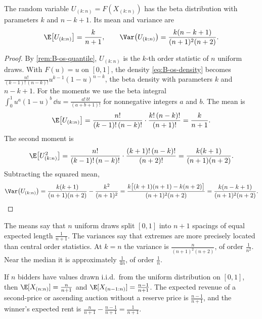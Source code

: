\begin{proposition}\label{prop:B-os-uniform}
The random variable $U_{(k:n)} = F(X_{(k:n)})$ has the beta distribution with parameters $k$ and $n-k+1$.
Its mean and variance are
\begin{equation}\label{eq:B-os-beta-moments}
  \E\big[U_{(k:n)}\big] = \frac{k}{n+1}, \qquad \Var\big(U_{(k:n)}\big) = \frac{k(n-k+1)}{(n+1)^2(n+2)}.
\end{equation}
\end{proposition}

\begin{proof}
By \cref{rem:B-os-quantile}, $U_{(k:n)}$ is the $k$-th order statistic of $n$ uniform draws. With $F(u) = u$
on $[0,1]$, the density \eqref{eq:B-os-density} becomes $\frac{n!}{(k-1)!\,(n-k)!}u^{k-1}(1-u)^{n-k}$, the
beta density with parameters $k$ and $n-k+1$. For the moments we use the beta integral
$\int_0^1 u^a(1-u)^b\,\dd u = \frac{a!\,b!}{(a+b+1)!}$ for nonnegative integers $a$ and $b$. The mean is
\begin{equation*}
  \E\big[U_{(k:n)}\big] = \frac{n!}{(k-1)!\,(n-k)!}\cdot\frac{k!\,(n-k)!}{(n+1)!} = \frac{k}{n+1}.
\end{equation*}
The second moment is
\begin{equation*}
  \E\big[U_{(k:n)}^2\big] = \frac{n!}{(k-1)!\,(n-k)!}\cdot\frac{(k+1)!\,(n-k)!}{(n+2)!}
  = \frac{k(k+1)}{(n+1)(n+2)}.
\end{equation*}
Subtracting the squared mean,
\begin{equation*}
  \Var\big(U_{(k:n)}\big) = \frac{k(k+1)}{(n+1)(n+2)} - \frac{k^2}{(n+1)^2}
  = \frac{k\big[(k+1)(n+1) - k(n+2)\big]}{(n+1)^2(n+2)} = \frac{k(n-k+1)}{(n+1)^2(n+2)}.
\end{equation*}
\end{proof}

The means say that $n$ uniform draws split $[0,1]$ into $n+1$ spacings of equal expected length
$\frac{1}{n+1}$. The variances say that extremes are more precisely located than central order
statistics. At $k = n$ the variance is $\frac{n}{(n+1)^2(n+2)}$, of order $\frac{1}{n^2}$. Near the
median it is approximately $\frac{1}{4n}$, of order $\frac{1}{n}$.

\begin{corollary}\label{cor:B-os-revenue}
If $n$ bidders have values drawn i.i.d.\ from the uniform distribution on $[0,1]$, then
$\E[X_{(n:n)}] = \frac{n}{n+1}$ and $\E[X_{(n-1:n)}] = \frac{n-1}{n+1}$. The expected revenue of a
second-price or ascending auction without a reserve price is $\frac{n-1}{n+1}$, and the winner's expected
rent is $\frac{n}{n+1} - \frac{n-1}{n+1} = \frac{1}{n+1}$.
\end{corollary}

